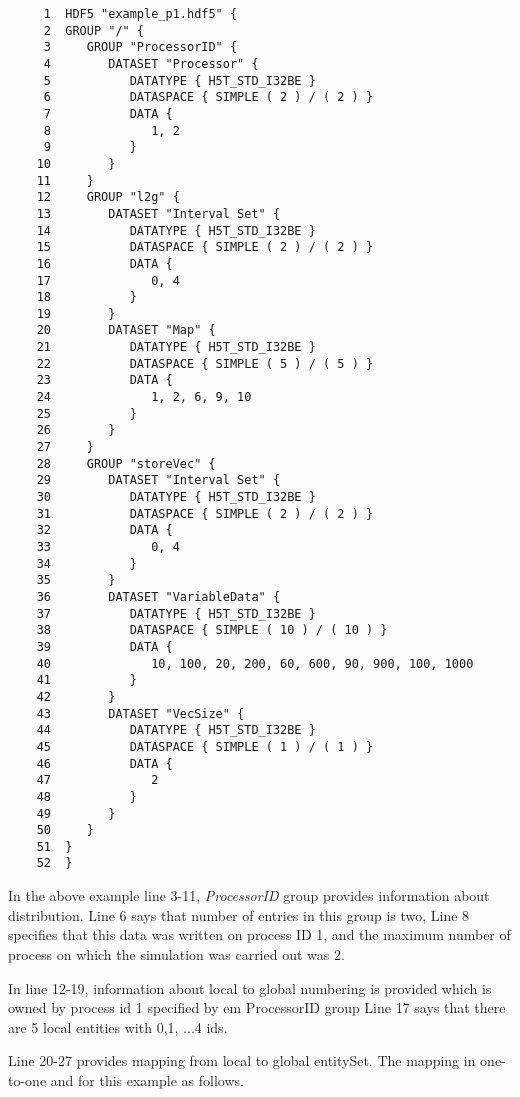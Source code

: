 \begin{verbatim} 
     1  HDF5 "example_p1.hdf5" {
     2  GROUP "/" {
     3     GROUP "ProcessorID" {
     4        DATASET "Processor" {
     5           DATATYPE { H5T_STD_I32BE }
     6           DATASPACE { SIMPLE ( 2 ) / ( 2 ) }
     7           DATA {
     8              1, 2
     9           }
    10        }
    11     }
    12     GROUP "l2g" {
    13        DATASET "Interval Set" {
    14           DATATYPE { H5T_STD_I32BE }
    15           DATASPACE { SIMPLE ( 2 ) / ( 2 ) }
    16           DATA {
    17              0, 4
    18           }
    19        }
    20        DATASET "Map" {
    21           DATATYPE { H5T_STD_I32BE }
    22           DATASPACE { SIMPLE ( 5 ) / ( 5 ) }
    23           DATA {
    24              1, 2, 6, 9, 10
    25           }
    26        }
    27     }
    28     GROUP "storeVec" {
    29        DATASET "Interval Set" {
    30           DATATYPE { H5T_STD_I32BE }
    31           DATASPACE { SIMPLE ( 2 ) / ( 2 ) }
    32           DATA {
    33              0, 4
    34           }
    35        }
    36        DATASET "VariableData" {
    37           DATATYPE { H5T_STD_I32BE }
    38           DATASPACE { SIMPLE ( 10 ) / ( 10 ) }
    39           DATA {
    40              10, 100, 20, 200, 60, 600, 90, 900, 100, 1000
    41           }
    42        }
    43        DATASET "VecSize" {
    44           DATATYPE { H5T_STD_I32BE }
    45           DATASPACE { SIMPLE ( 1 ) / ( 1 ) }
    46           DATA {
    47              2
    48           }
    49        }
    50     }
    51  }
    52  }
\end{verbatim} 

\par In the above example line 3-11, {\em ProcessorID} group provides 
information about distribution. Line 6 says that number of entries in
this group is two, Line 8 specifies that this data was written on
process ID 1, and the maximum number of process on which
the simulation was carried out was 2. \\

\par In line 12-19, information about local to global numbering is
provided which is owned by process id 1 {specified by {em ProcessorID}
group} Line 17 says that there are 5 local entities with {0,1, ...4} ids. 

\par Line 20-27 provides mapping from local to global entitySet. The
mapping in one-to-one and for this example as follows.

